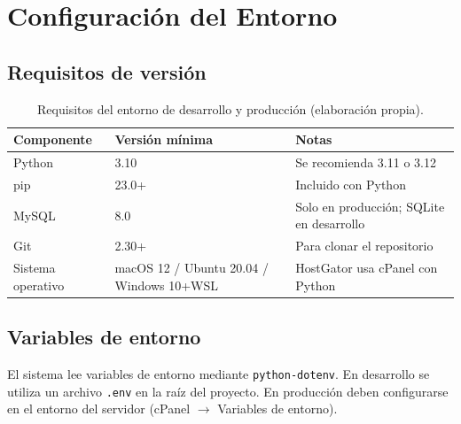\documentclass[10pt,letterpaper]{report}
\begin{document}
\chapter{Configuración del Entorno}

\section{Requisitos de versión}

\begin{table}[h!]
\centering
\caption{Requisitos del entorno de desarrollo y producción (elaboración propia).}
\label{tab:requisitos}
\begin{tabularx}{\textwidth}{l l X}
\toprule
\textbf{Componente} & \textbf{Versión mínima} & \textbf{Notas} \\
\midrule
Python & 3.10 & Se recomienda 3.11 o 3.12 \\
pip & 23.0+ & Incluido con Python \\
MySQL & 8.0 & Solo en producción; SQLite en desarrollo \\
Git & 2.30+ & Para clonar el repositorio \\
Sistema operativo & macOS 12 / Ubuntu 20.04 / Windows 10+WSL & HostGator usa cPanel con Python \\
\bottomrule
\end{tabularx}
\end{table}

\section{Variables de entorno}

El sistema lee variables de entorno mediante \texttt{python-dotenv}. En desarrollo se utiliza un archivo \texttt{.env} en la raíz del proyecto. En producción deben configurarse en el entorno del servidor (cPanel $\to$ Variables de entorno).
\end{document}
